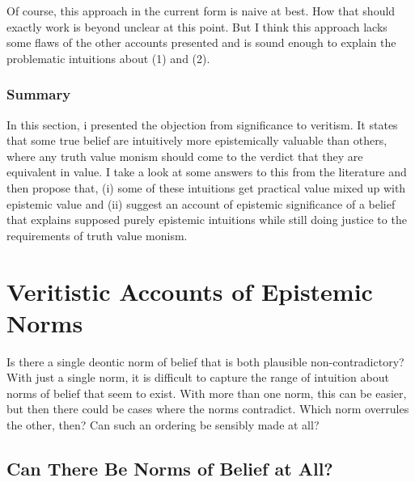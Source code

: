 \documentclass[12pt,numbers=noenddot]{scrartcl}
\begin{document}
Of course, this approach in the current form is naive at best. How that should exactly work is beyond unclear at this point. But I think this approach lacks some flaws of the other accounts presented and is sound enough to explain the problematic intuitions about (1) and (2).


\subsubsection{Summary}
In this section, i presented the objection from significance to veritism. It states that some true belief are intuitively more epistemically valuable than others, where any truth value monism should come to the verdict that they are equivalent in value. I take a look at some answers to this from the literature and then propose that, (i) some of these intuitions get practical value mixed up with epistemic value and (ii) suggest an account of epistemic significance of a belief that explains supposed purely epistemic intuitions while still doing justice to the requirements of truth value monism.

\section{Veritistic Accounts of Epistemic Norms}

Is there a single deontic norm of belief that is both plausible non-contradictory? With just a single norm, it is difficult to capture the range of intuition about norms of belief that seem to exist. With more than one norm, this can be easier, but then there could be cases where the norms contradict. Which norm overrules the other, then? Can such an ordering be sensibly made at all?

\subsection{Can There Be Norms of Belief at All?}



\end{document}

